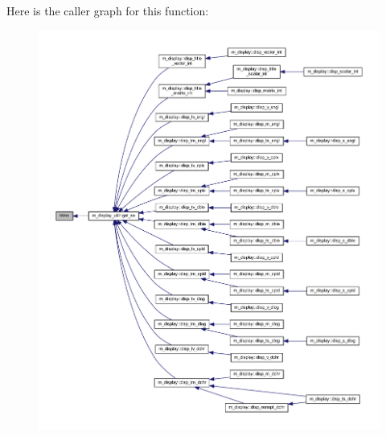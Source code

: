 Here is the caller graph for this function\+:
\nopagebreak
\begin{figure}[H]
\begin{center}
\leavevmode
\includegraphics[width=350pt]{M__display_8f90_a18d4b146c386b49bb8b6512c91988ae3_icgraph}
\end{center}
\end{figure}
